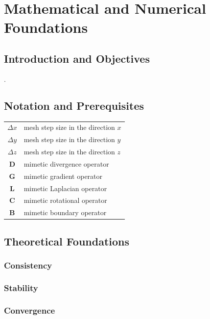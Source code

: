 \chapter{Mathematical and Numerical Foundations}

\section{Introduction and Objectives}

\cite{daVeiga2014}.

\section{Notation and Prerequisites}

\begin{table}[ht!]
	\centering
	\begin{tabular}{cl}
		$\Delta x$  & mesh step size in the direction $x$ \\
		$\Delta y$  & mesh step size in the direction $y$ \\
		$\Delta z$  & mesh step size in the direction $z$ \\
		$\symbf{D}$ & mimetic divergence operator         \\
		$\symbf{G}$ & mimetic gradient operator           \\
		$\symbf{L}$ & mimetic Laplacian operator          \\
		$\symbf{C}$ & mimetic rotational operator         \\
		$\symbf{B}$ & mimetic boundary operator
	\end{tabular}
\end{table}

\section{Theoretical Foundations}

\subsection{Consistency}

\subsection{Stability}

\subsection{Convergence}

